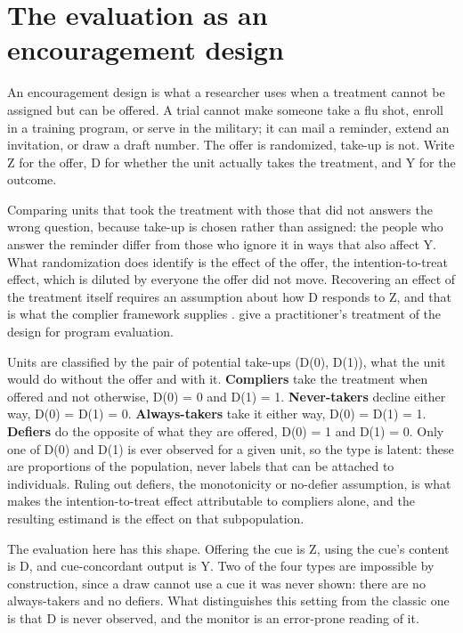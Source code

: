 \documentclass[11pt]{article}
\begin{document}
\section{The evaluation as an encouragement design}
An encouragement design is what a researcher uses when a treatment cannot be assigned but can be offered. A trial cannot make someone take a flu shot, enroll in a training program, or serve in the military; it can mail a reminder, extend an invitation, or draw a draft number. The offer is randomized, take-up is not. Write Z for the offer, D for whether the unit actually takes the treatment, and Y for the outcome.

Comparing units that took the treatment with those that did not answers the wrong question, because take-up is chosen rather than assigned: the people who answer the reminder differ from those who ignore it in ways that also affect Y. What randomization does identify is the effect of the offer, the intention-to-treat effect, which is diluted by everyone the offer did not move. Recovering an effect of the treatment itself requires an assumption about how D responds to Z, and that is what the complier framework supplies \citep{angrist1996identification,imbens2015causal}. \citet{diamond2007encouragement} give a practitioner’s treatment of the design for program evaluation.

Units are classified by the pair of potential take-ups (D(0), D(1)), what the unit would do without the offer and with it. \textbf{Compliers} take the treatment when offered and not otherwise, D(0) = 0 and D(1) = 1. \textbf{Never-takers} decline either way, D(0) = D(1) = 0. \textbf{Always-takers} take it either way, D(0) = D(1) = 1. \textbf{Defiers} do the opposite of what they are offered, D(0) = 1 and D(1) = 0. Only one of D(0) and D(1) is ever observed for a given unit, so the type is latent: these are proportions of the population, never labels that can be attached to individuals. Ruling out defiers, the monotonicity or no-defier assumption, is what makes the intention-to-treat effect attributable to compliers alone, and the resulting estimand is the effect on that subpopulation.

The evaluation here has this shape. Offering the cue is Z, using the cue’s content is D, and cue-concordant output is Y. Two of the four types are impossible by construction, since a draw cannot use a cue it was never shown: there are no always-takers and no defiers. What distinguishes this setting from the classic one is that D is never observed, and the monitor is an error-prone reading of it.
\end{document}
